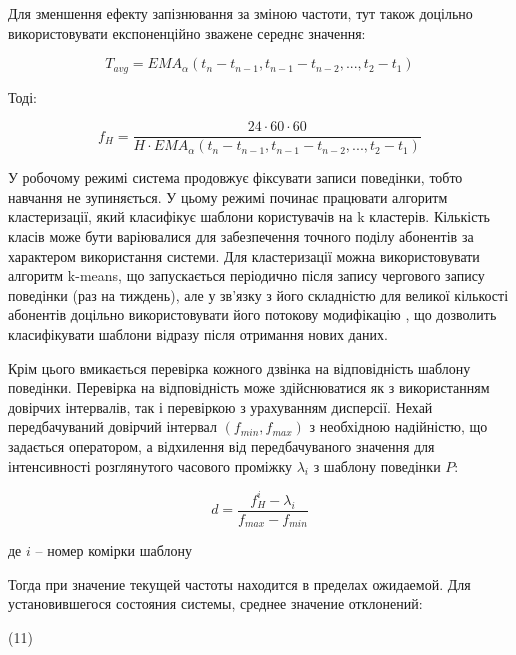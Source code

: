 Для зменшення ефекту запізнювання за зміною частоти, тут також доцільно використовувати експоненційно зважене середнє значення:

\begin{equation}\label{eq:t_avg} T_{avg} = {EMA}_{\alpha}(t_n - t_{n-1}, t_{n-1} - t_{n-2}, ..., t_{2} - t_{1}) \end{equation}

Тоді:

\begin{equation}\label{eq:cur_freq_final} f_H = \frac{24 \cdot 60 \cdot 60}{H \cdot {EMA}_{\alpha}(t_n - t_{n-1}, t_{n-1} - t_{n-2}, ..., t_{2} - t_{1})} \end{equation}

У робочому режимі система продовжує фіксувати записи поведінки, тобто навчання не зупиняється. У цьому режимі починає працювати алгоритм кластеризації, який класифікує шаблони користувачів на k кластерів. Кількість класів може бути варіювалися для забезпечення точного поділу абонентів за характером використання системи. Для кластеризації можна використовувати алгоритм k-means, що запускається періодично після запису чергового запису поведінки (раз на тиждень), але у зв'язку з його складністю для великої кількості абонентів доцільно використовувати його потокову модифікацію \cite{dasgupta2008clustering}, що дозволить класифікувати шаблони відразу після отримання нових даних.

Крім цього вмикається перевірка кожного дзвінка на відповідність шаблону поведінки. Перевірка на відповідність може здійснюватися як з використанням довірчих інтервалів, так і перевіркою з урахуванням дисперсії. Нехай передбачуваний довірчий інтервал $(f_{min}, f_{max})$ з необхідною надійністю, що задається оператором, а відхилення від передбачуваного значення для інтенсивності розглянутого часового проміжку $\lambda_i$ з шаблону поведінки $P$:

\begin{equation}\label{eq:div} d = \frac{f_H^i - \lambda_i}{f_{max} - f_{min}} \end{equation}
\begin{ESKDexplanation}
  \item де $i$ -- номер комірки шаблону
\end{ESKDexplanation}

Тогда при  значение текущей частоты находится в пределах ожидаемой.
Для установившегося состояния системы, среднее значение отклонений:

(11)

